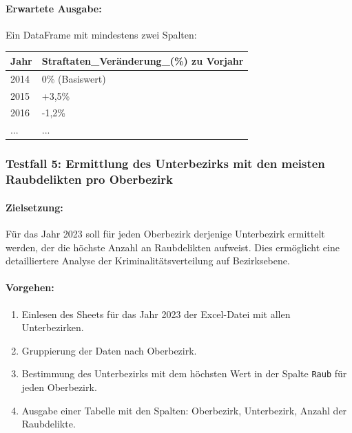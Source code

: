 \documentclass[11pt,a4paper]{article}
\begin{document}
\paragraph{Erwartete Ausgabe:}
Ein DataFrame mit mindestens zwei Spalten:
\begin{center}
    \begin{tabular}{|l|l|}
        \hline
        \textbf{Jahr} & \textbf{Straftaten\_Veränderung\_(\%) zu Vorjahr} \\
        \hline
        2014 & 0\% (Basiswert) \\
        2015 & +3,5\% \\
        2016 & -1,2\% \\
        ... & ...\\
        \hline
    \end{tabular}
\end{center}

\subsubsection{Testfall 5: Ermittlung des Unterbezirks mit den meisten Raubdelikten pro Oberbezirk}
\paragraph{Zielsetzung:}
Für das Jahr 2023 soll für jeden Oberbezirk derjenige Unterbezirk ermittelt werden, der die höchste Anzahl an Raubdelikten aufweist. Dies ermöglicht eine detailliertere Analyse der Kriminalitätsverteilung auf Bezirksebene.

\paragraph{Vorgehen:}
\begin{enumerate}
    \item Einlesen des Sheets für das Jahr 2023 der Excel-Datei mit allen Unterbezirken.
    \item Gruppierung der Daten nach Oberbezirk.
    \item Bestimmung des Unterbezirks mit dem höchsten Wert in der Spalte \texttt{Raub} für jeden Oberbezirk.
    \item Ausgabe einer Tabelle mit den Spalten: Oberbezirk, Unterbezirk, Anzahl der Raubdelikte.
\end{enumerate}
\end{document}
